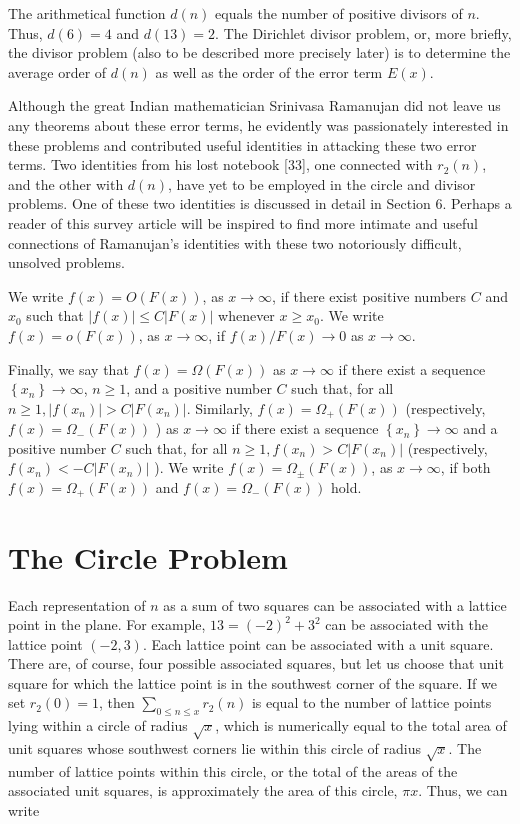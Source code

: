 \documentclass[10pt]{article}
\theoremstyle{plain}
\begin{document}
The arithmetical function $d(n)$ equals the number of positive divisors of $n$. Thus, $d(6)=4$ and $d(13)=2$. The Dirichlet divisor problem, or, more briefly, the divisor problem (also to be described more precisely later) is to determine the average order of $d(n)$ as well as the order of the error term $E(x)$.

Although the great Indian mathematician Srinivasa Ramanujan did not leave us any theorems about these error terms, he evidently was passionately interested in these problems and contributed useful identities in attacking these two error terms. Two identities from his lost notebook [33], one connected with $r_{2}(n)$, and the other with $d(n)$, have yet to be employed in the circle and divisor problems. One of these two identities is discussed in detail in Section 6. Perhaps a reader of this survey article will be inspired to find more intimate and useful connections of Ramanujan's identities with these two notoriously difficult, unsolved problems.

We write $f(x)=O(F(x))$, as $x \to \infty$, if there exist positive numbers $C$ and $x_{0}$ such that $|f(x)| \leq C|F(x)|$ whenever $x \geq x_{0}$. We write $f(x)=o(F(x))$, as $x \to \infty$, if $f(x) / F(x) \to 0$ as $x \to \infty$.

Finally, we say that $f(x)=\Omega(F(x))$ as $x \to \infty$ if there exist a sequence $\left\{x_{n}\right\} \to \infty$, $n \geq 1$, and a positive number $C$ such that, for all $n \geq 1,\left|f\left(x_{n}\right)\right|>C\left|F\left(x_{n}\right)\right|$. Similarly, $f(x)=\Omega_{+}(F(x))$ (respectively, $f(x)=\Omega_{-}(F(x))$ ) as $x \to \infty$ if there exist a sequence $\left\{x_{n}\right\} \to \infty$ and a positive number $C$ such that, for all $n \geq 1, f\left(x_{n}\right)>C\left|F\left(x_{n}\right)\right|$ (respectively, $f\left(x_{n}\right)<-C\left|F\left(x_{n}\right)\right|$ ). We write $f(x)=\Omega_{ \pm}(F(x))$, as $x \to \infty$, if both $f(x)=\Omega_{+}(F(x))$ and $f(x)=\Omega_{-}(F(x))$ hold.

\section{The Circle Problem}

Each representation of $n$ as a sum of two squares can be associated with a lattice point in the plane. For example, $13=(-2)^{2}+3^{2}$ can be associated with the lattice point $(-2,3)$. Each lattice point can be associated with a unit square. There are, of course, four possible associated squares, but let us choose that unit square for which the lattice point is in the southwest corner of the square. If we set $r_{2}(0)=1$, then $\sum_{0 \leq n \leq x} r_{2}(n)$ is equal to the number of lattice points lying within a circle of radius $\sqrt{x}$, which is numerically equal to the total area of unit squares whose southwest corners lie within this circle of radius $\sqrt{x}$. The number of lattice points within this circle, or the total of the areas of the associated unit squares, is approximately the area of this circle, $\pi x$. Thus, we can write
\end{document}
